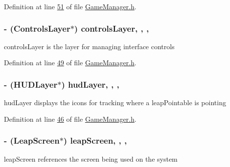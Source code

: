 Definition at line \hyperlink{_game_manager_8h_source_l00051}{51} of file \hyperlink{_game_manager_8h_source}{Game\-Manager.\-h}.

\hypertarget{interface_game_manager_a0ee5903be06e4a676ddde4c1f03530a7}{
\subsubsection[{controls\-Layer}]{\setlength{\rightskip}{0pt plus 5cm}-\/ ({\bf Controls\-Layer}$\ast$) controls\-Layer\hspace{0.3cm}{\ttfamily [read]}, {\ttfamily [write]}, {\ttfamily [nonatomic]}, {\ttfamily [strong]}}}\label{d4/d94/interface_game_manager_a0ee5903be06e4a676ddde4c1f03530a7}
controls\-Layer is the layer for managing interface controls 

Definition at line \hyperlink{_game_manager_8h_source_l00049}{49} of file \hyperlink{_game_manager_8h_source}{Game\-Manager.\-h}.

\hypertarget{interface_game_manager_ae286fb2f9d31810d73c7231a574b56b0}{
\subsubsection[{hud\-Layer}]{\setlength{\rightskip}{0pt plus 5cm}-\/ ({\bf H\-U\-D\-Layer}$\ast$) hud\-Layer\hspace{0.3cm}{\ttfamily [read]}, {\ttfamily [write]}, {\ttfamily [nonatomic]}, {\ttfamily [strong]}}}\label{d4/d94/interface_game_manager_ae286fb2f9d31810d73c7231a574b56b0}
hud\-Layer displays the icons for tracking where a leap\-Pointable is pointing 

Definition at line \hyperlink{_game_manager_8h_source_l00046}{46} of file \hyperlink{_game_manager_8h_source}{Game\-Manager.\-h}.

\hypertarget{interface_game_manager_a85cb30e21c987f66855a762c6ba88096}{
\subsubsection[{leap\-Screen}]{\setlength{\rightskip}{0pt plus 5cm}-\/ (Leap\-Screen$\ast$) leap\-Screen\hspace{0.3cm}{\ttfamily [read]}, {\ttfamily [write]}, {\ttfamily [nonatomic]}, {\ttfamily [strong]}}}\label{d4/d94/interface_game_manager_a85cb30e21c987f66855a762c6ba88096}
leap\-Screen references the screen being used on the system 

